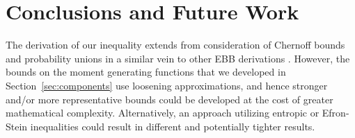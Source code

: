 \documentclass[]{interact}
\theoremstyle{plain}%
\theoremstyle{definition}
\theoremstyle{remark}
\begin{document}
\section{Conclusions and Future Work}\label{sec:future}

The derivation of our inequality extends from consideration of Chernoff bounds and probability unions in a similar vein to other EBB derivations \citep{Maurer50empiricalbernstein,bardenet2015}.
However, the bounds on the moment generating functions that we developed in Section~\ref{sec:components} use loosening approximations, and hence stronger and/or more representative bounds could be developed at the cost of greater mathematical complexity.
Alternatively, an approach utilizing entropic \citep{Boucheron_concentrationinequalities} or Efron-Stein inequalities \citep{efron1981} could result in different and potentially tighter results.

\end{document}

